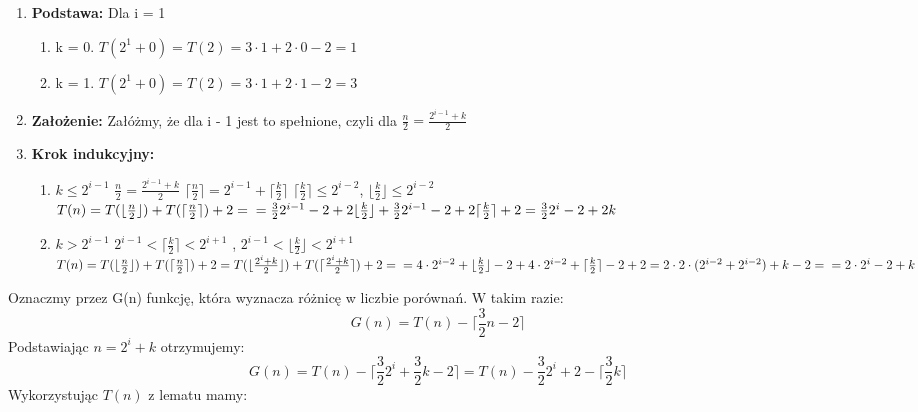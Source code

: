 \documentclass[a4paper,10pt]{article}
\begin{document}
\begin{enumerate}
	\item \textbf{Podstawa:} \newline
		Dla i = 1
		\begin{enumerate}[label=(\Alph*)]
		\item k = 0. $T(2^1 + 0) = T(2) = 3 \cdot 1 + 2 \cdot 0 - 2 = 1 $ 
		\item k = 1. $T(2^1 + 0) = T(2) = 3 \cdot 1 + 2 \cdot 1 - 2 =3 $
		\end{enumerate}
	\item \textbf{Założenie:} \newline
	Załóżmy, że dla i - 1 jest to spełnione, czyli dla $\frac{n}{2} = \frac{2^{i-1} + k} {2}$
	\item \textbf{Krok indukcyjny:} \newline
	\begin{enumerate}[label=(\Alph*)]
		\item $k \leq 2^{i-1}$ \newline 
			$\frac{n}{2} = \frac{2^{i-1} + k}{2}$ \newline
			$\lceil \frac{n}{2} \rceil = 2^{i-1} + \lceil \frac{k}{2} \rceil$ \newline
			$\lceil \frac{k}{2} \rceil \leq 2^{i-2}$, $\lfloor \frac{k}{2} \rfloor \leq 2^{i-2}$ \newline
			$T(n) = T(\lfloor \frac{n}{2} \rfloor) + T(\lceil \frac{n}{2}\rceil) + 2 = \newline 
			= \frac{3}{2} 2^{i-1} - 2 + 2\lfloor \frac{k}{2} \rfloor + \frac{3}{2} 2^{i-1} - 2 + 2\lceil \frac{k}{2} \rceil +  				2 = \frac{3}{2} 2^i - 2 + 2k$
		\item $k > 2^{i-1}$ \newline
			$ 2^{i-1} \less \lceil \frac{k}{2} \rceil \less 2^{i+1}$ , $ 2^{i-1} \less \lfloor \frac{k}{2} \rfloor \less 2^{i+1}$   \newline
			$T(n) = T(\lfloor \frac{n}{2} \rfloor) + T(\lceil \frac{n}{2}\rceil) + 2 = T(\lfloor \frac{2^i + k }{2} \rfloor) + T(\lceil \frac{2^i + k }{2}\rceil) + 2 = \newline
			= 4\cdot2^{i-2} + \lfloor \frac{k}{2} \rfloor - 2 +   4\cdot2^{i-2}+ \lceil \frac{k}{2}\rceil -2 + 2 =   2\cdot2\cdot(2^{i-2} + 2^{i-2})  + k - 2 = \newline
			=  2 \cdot 2^{i} - 2 + k$ \newline
		\end{enumerate}
	\end{enumerate}
\begin{flushright}
\qedsymbol 
\end{flushright}
		Oznaczmy przez G(n) funkcję, która wyznacza różnicę w liczbie porównań. W takim razie: \newline
		$$ G(n) = T(n) - \lceil \frac{3}{2} n - 2 \rceil $$ \newline
		Podstawiając $ n = 2^i +k$ otrzymujemy: \newline 
		$$ G(n) = T(n) - \lceil \frac{3}{2} 2^i + \frac{3}{2} k - 2 \rceil = T(n) - \frac{3}{2} 2^i + 2 - \lceil \frac{3}{2} k \rceil$$ \newline
		Wykorzystując $T(n)$ z lematu mamy:\newline
		
\end{document}

